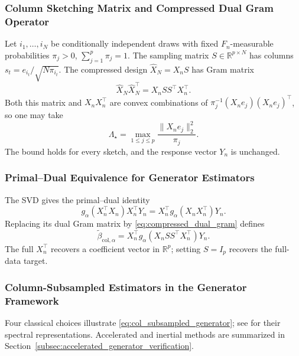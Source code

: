 \documentclass[pdflatex,iicol,sn-mathphys-ay]{sn-jnl}
\theoremstyle{thmstyleone}
\theoremstyle{thmstylethree}
\theoremstyle{thmstyletwo}
\newcommand{\RR}{\mathbb{R}}
\begin{document}
\subsubsection{Column Sketching Matrix and Compressed Dual Gram Operator}
\label{subsubsec:column_sketching_matrix}
Let $i_1,\ldots,i_N$ be conditionally independent draws with fixed
$F_n$-measurable probabilities $\pi_j>0$, $\sum_{j=1}^p\pi_j=1$.
The sampling matrix $S\in\RR^{p\times N}$ has columns
$s_t=e_{i_t}/\sqrt{N\pi_{i_t}}$. The compressed design $\widehat X_N=X_nS$
has Gram matrix
\begin{equation}
 \widehat X_N\widehat X_N^\top=X_nSS^\top X_n^\top.
 \label{eq:compressed_dual_gram}
\end{equation}
Both this matrix and $X_nX_n^\top$ are convex combinations of
$\pi_j^{-1}(X_ne_j)(X_ne_j)^\top$, so one may take
\[
 \Lambda_\star=\max_{1\le j\le p}\frac{\|X_ne_j\|_2^2}{\pi_j}.
\]
The bound holds for every sketch, and the response vector $Y_n$ is unchanged.

\subsubsection{Primal--Dual Equivalence for Generator Estimators}
\label{subsubsec:dual_generator_representation}

The SVD gives the primal--dual identity
\begin{equation}
 g_\alpha(X_n^\top X_n)X_n^\top Y_n
 =X_n^\top g_\alpha(X_nX_n^\top)Y_n.
 \label{eq:intro_primal_dual_identity}
\end{equation}
Replacing its dual Gram matrix by \eqref{eq:compressed_dual_gram} defines
\begin{equation}
 \widetilde\beta_{\mathrm{col},\alpha}
 =X_n^\top g_\alpha(X_nSS^\top X_n^\top)Y_n.
 \label{eq:col_subsampled_generator}
\end{equation}
The full $X_n^\top$ recovers a coefficient vector in $\RR^p$;
setting $S=I_p$ recovers the full-data target.

\subsubsection{Column-Subsampled Estimators in the Generator Framework}
\label{subsubsec:column_subsampled_estimators}

Four classical choices illustrate \eqref{eq:col_subsampled_generator}; see
\citet[Section~3.2 and Table~1]{wang2025debiasing} for their spectral
representations. Accelerated and inertial methods are summarized in
Section~\ref{subsec:accelerated_generator_verification}.
\end{document}

